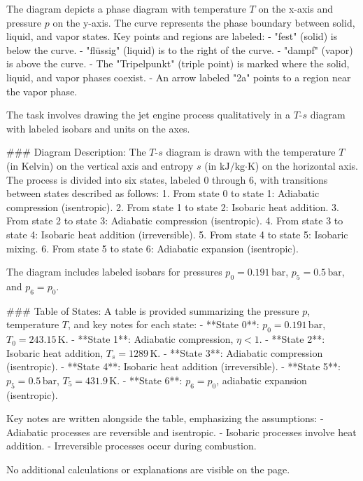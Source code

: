 The diagram depicts a phase diagram with temperature \( T \) on the x-axis and pressure \( p \) on the y-axis. The curve represents the phase boundary between solid, liquid, and vapor states. Key points and regions are labeled:  
- "fest" (solid) is below the curve.  
- "flüssig" (liquid) is to the right of the curve.  
- "dampf" (vapor) is above the curve.  
- The "Tripelpunkt" (triple point) is marked where the solid, liquid, and vapor phases coexist.  
- An arrow labeled "2a" points to a region near the vapor phase.

The task involves drawing the jet engine process qualitatively in a \( T \)-\( s \) diagram with labeled isobars and units on the axes.  

### Diagram Description:  
The \( T \)-\( s \) diagram is drawn with the temperature \( T \) (in Kelvin) on the vertical axis and entropy \( s \) (in \( \text{kJ/kg·K} \)) on the horizontal axis. The process is divided into six states, labeled 0 through 6, with transitions between states described as follows:  
1. From state 0 to state 1: Adiabatic compression (isentropic).  
2. From state 1 to state 2: Isobaric heat addition.  
3. From state 2 to state 3: Adiabatic compression (isentropic).  
4. From state 3 to state 4: Isobaric heat addition (irreversible).  
5. From state 4 to state 5: Isobaric mixing.  
6. From state 5 to state 6: Adiabatic expansion (isentropic).  

The diagram includes labeled isobars for pressures \( p_0 = 0.191 \, \text{bar} \), \( p_5 = 0.5 \, \text{bar} \), and \( p_6 = p_0 \).  

### Table of States:  
A table is provided summarizing the pressure \( p \), temperature \( T \), and key notes for each state:  
- **State 0**: \( p_0 = 0.191 \, \text{bar} \), \( T_0 = 243.15 \, \text{K} \).  
- **State 1**: Adiabatic compression, \( \eta < 1 \).  
- **State 2**: Isobaric heat addition, \( T_s = 1289 \, \text{K} \).  
- **State 3**: Adiabatic compression (isentropic).  
- **State 4**: Isobaric heat addition (irreversible).  
- **State 5**: \( p_5 = 0.5 \, \text{bar} \), \( T_5 = 431.9 \, \text{K} \).  
- **State 6**: \( p_6 = p_0 \), adiabatic expansion (isentropic).  

Key notes are written alongside the table, emphasizing the assumptions:  
- Adiabatic processes are reversible and isentropic.  
- Isobaric processes involve heat addition.  
- Irreversible processes occur during combustion.  

No additional calculations or explanations are visible on the page.